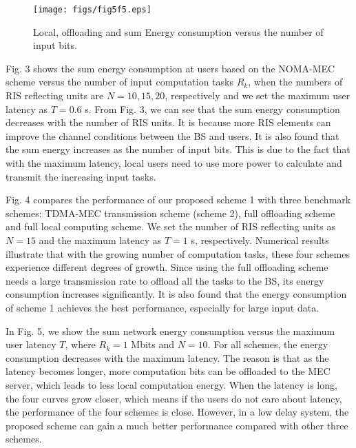\documentclass[journal]{IEEEtran}
\begin{document}
\begin{figure}[htb]
	\centering
	\texttt{[image: figs/fig5f5.eps]}
	\vspace{-1.5em}
	\caption{ Local, offloading and sum Energy consumption versus the number of input bits.}\label{fig_5}
	\vspace{-.5em}
\end{figure}

{Fig. 3 shows the sum energy consumption at users based on the NOMA-MEC scheme versus the number of input computation tasks $R_k$, when the numbers of RIS reflecting units are $N=10,15,20$, respectively and we set the maximum user latency as $T=0.6$ s. From Fig. 3, we can see that the sum energy consumption decreases with the number of RIS units. It is because more RIS elements can improve the channel conditions between the BS and users. It is also found that the sum energy increases as the number of input bits. This is due to the fact that with the maximum latency, local users need to use more power to calculate and transmit the increasing input tasks.}

Fig. 4 compares the performance of our proposed scheme 1 with three benchmark schemes: TDMA-MEC transmission scheme (scheme 2), full offloading scheme and full local computing scheme. We set the number of RIS reflecting units as $N=15$ and the maximum latency as $T=1$ s, respectively. Numerical results illustrate that with the growing number of computation tasks, these four schemes experience different degrees of growth. Since using the full offloading scheme needs a large transmission rate to offload all the tasks to the BS, its energy consumption increases significantly.
It is also found that the energy consumption of scheme 1 achieves the best performance, especially for large input data.

In Fig. 5, we show the sum network energy consumption versus the maximum user latency $T$, where $R_k=1$ Mbits and $N=10$.
For all schemes, the energy consumption decreases with the maximum latency. The reason is that as the latency becomes longer, more computation bits can be offloaded to the MEC server, which leads to less local computation energy.
When the latency is long, the four curves grow closer, which means if the users do not care about latency, the performance of the four schemes is close. However, in a low delay system, the proposed scheme can gain a much better performance compared with other three schemes.
\end{document}
